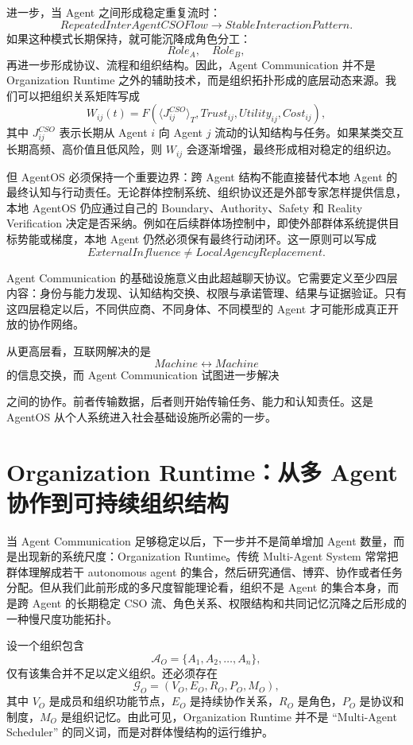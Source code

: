 进一步，当 Agent 之间形成稳定重复流时：
\[
RepeatedInterAgentCSOFlow
\rightarrow
StableInteractionPattern.
\]
如果这种模式长期保持，就可能沉降成角色分工：
\[
Role_A,\quad Role_B,
\]
再进一步形成协议、流程和组织结构。因此，Agent Communication 并不是 Organization Runtime 之外的辅助技术，而是组织拓扑形成的底层动态来源。我们可以把组织关系矩阵写成
\[
W_{ij}(t)
=
F(
\langle J^{CSO}_{ij}\rangle_T,
Trust_{ij},
Utility_{ij},
Cost_{ij}
),
\]
其中 $J^{CSO}_{ij}$ 表示长期从 Agent $i$ 向 Agent $j$ 流动的认知结构与任务。如果某类交互长期高频、高价值且低风险，则 $W_{ij}$ 会逐渐增强，最终形成相对稳定的组织边。

但 AgentOS 必须保持一个重要边界：跨 Agent 结构不能直接替代本地 Agent 的最终认知与行动责任。无论群体控制系统、组织协议还是外部专家怎样提供信息，本地 AgentOS 仍应通过自己的 Boundary、Authority、Safety 和 Reality Verification 决定是否采纳。例如在后续群体场控制中，即使外部群体系统提供目标势能或梯度，本地 Agent 仍然必须保有最终行动闭环。这一原则可以写成
\[
ExternalInfluence
\neq
LocalAgencyReplacement.
\]

Agent Communication 的基础设施意义由此超越聊天协议。它需要定义至少四层内容：身份与能力发现、认知结构交换、权限与承诺管理、结果与证据验证。只有这四层稳定以后，不同供应商、不同身体、不同模型的 Agent 才可能形成真正开放的协作网络。

从更高层看，互联网解决的是
\[
Machine\leftrightarrow Machine
\]
的信息交换，而 Agent Communication 试图进一步解决
\begin{statementbox}
\centering
{}
\end{statementbox}
之间的协作。前者传输数据，后者则开始传输任务、能力和认知责任。这是 AgentOS 从个人系统进入社会基础设施所必需的一步。

\section{Organization Runtime：从多 Agent 协作到可持续组织结构}

当 Agent Communication 足够稳定以后，下一步并不是简单增加 Agent 数量，而是出现新的系统尺度：Organization Runtime。传统 Multi-Agent System 常常把群体理解成若干 autonomous agent 的集合，然后研究通信、博弈、协作或者任务分配。但从我们此前形成的多尺度智能理论看，组织不是 Agent 的集合本身，而是跨 Agent 的长期稳定 CSO 流、角色关系、权限结构和共同记忆沉降之后形成的一种慢尺度功能拓扑。

设一个组织包含
\[
\mathcal A_O=\{A_1,A_2,\ldots,A_n\},
\]
仅有该集合并不足以定义组织。还必须存在
\[
\mathcal G_O
=
(V_O,E_O,R_O,P_O,M_O),
\]
其中 $V_O$ 是成员和组织功能节点，$E_O$ 是持续协作关系，$R_O$ 是角色，$P_O$ 是协议和制度，$M_O$ 是组织记忆。由此可见，Organization Runtime 并不是 ``Multi-Agent Scheduler'' 的同义词，而是对群体慢结构的运行维护。


